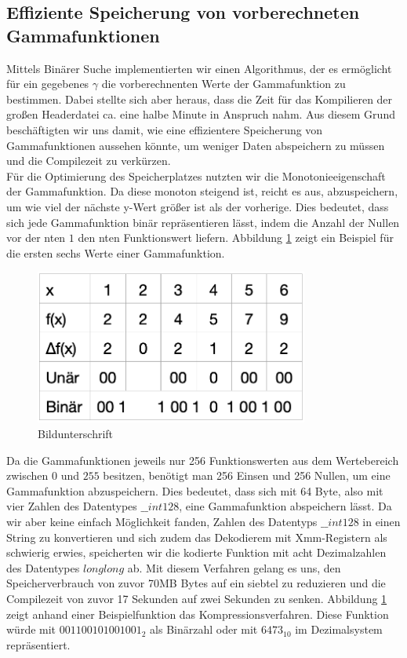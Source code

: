\documentclass[course=erap]{aspdoc}
\begin{document}
	\subsection{Effiziente Speicherung von vorberechneten Gammafunktionen}
	Mittels Binärer Suche implementierten wir einen Algorithmus, der es ermöglicht für ein gegebenes $\gamma$ die vorberechnenten Werte der Gammafunktion zu bestimmen.  Dabei stellte sich aber heraus, dass die Zeit für das Kompilieren der großen Headerdatei ca. eine halbe Minute in Anspruch nahm. Aus diesem Grund beschäftigten wir uns damit, wie eine effizientere Speicherung von Gammafunktionen aussehen könnte, um weniger Daten abspeichern zu müssen und die Compilezeit zu verkürzen.
	\\
	\newline
	\noindent
	Für die Optimierung des Speicherplatzes nutzten wir die Monotonieeigenschaft der Gammafunktion. Da diese monoton steigend ist, reicht es aus, abzuspeichern, um wie viel der nächste y-Wert größer ist als der vorherige. Dies bedeutet, dass sich jede Gammafunktion binär repräsentieren lässt, indem die Anzahl der Nullen vor der nten $1$ den nten Funktionswert liefern. Abbildung \ref{KompremierungBeispiel} zeigt ein Beispiel für die ersten sechs Werte einer Gammafunktion. 
	
	
	\noindent
	\begin{figure}
        \includegraphics[width=9cm]{Images/CompressionOfFunctions.png}
         \caption{Bildunterschrift}
         \label{KompremierungBeispiel}
    \end{figure}
	Da die Gammafunktionen jeweils nur 256 Funktionswerten aus dem Wertebereich zwischen $0$ und $255$ besitzen, benötigt man 256 Einsen und 256 Nullen, um eine Gammafunktion abzuspeichern. Dies bedeutet, dass sich mit 64 Byte, also mit vier Zahlen des Datentypes $\_\_int128$, eine Gammafunktion abspeichern lässt. Da wir aber keine einfach Möglichkeit fanden, Zahlen des Datentyps $\_\_int128$ in einen String zu konvertieren und sich zudem das Dekodierem mit Xmm-Registern als schwierig erwies, speicherten wir die kodierte Funktion mit acht Dezimalzahlen des Datentypes $long long$ ab. Mit diesem Verfahren gelang es uns, den Speicherverbrauch von zuvor 70MB Bytes auf ein siebtel zu reduzieren und die Compilezeit von zuvor 17 Sekunden auf zwei Sekunden zu senken. 
	Abbildung \ref{KompremierungBeispiel} zeigt anhand einer Beispielfunktion das Kompressionsverfahren. Diese Funktion würde mit $001100101001001_{2}$ als Binärzahl oder mit $6473_{10}$ im Dezimalsystem repräsentiert. 
\end{document}
